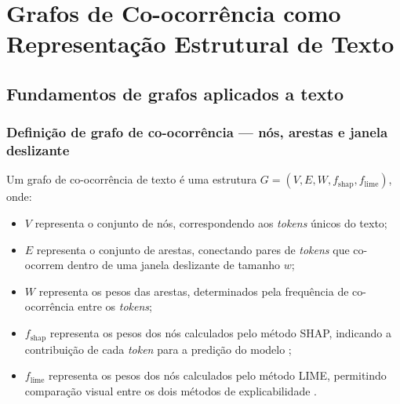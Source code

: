 \documentclass[
    12pt,                %
    openright,           %
    oneside,             %
    a4paper,             %
    english,             %
    brazil               %
]{abntex2}
\begin{document}
\section{Grafos de Co-ocorrência como Representação Estrutural de Texto}
\label{sec:grafos}

\subsection{Fundamentos de grafos aplicados a texto}
\label{subsec:grafos_fundamentos}

\subsubsection{Definição de grafo de co-ocorrência — nós, arestas e janela deslizante}
\label{subsubsec:grafos_definicao}

Um grafo de co-ocorrência de texto é uma estrutura 
$G = (V, E, W, f_{\text{shap}}, f_{\text{lime}})$, onde:

\begin{itemize}
    \item $V$ representa o conjunto de nós, correspondendo aos 
    \textit{tokens} únicos do texto;
    
    \item $E$ representa o conjunto de arestas, conectando pares 
    de \textit{tokens} que co-ocorrem dentro de uma janela 
    deslizante de tamanho $w$;
    
    \item $W$ representa os pesos das arestas, determinados pela 
    frequência de co-ocorrência entre os \textit{tokens};
    
    \item $f_{\text{shap}}$ representa os pesos dos nós calculados 
    pelo método SHAP, indicando a contribuição de cada 
    \textit{token} para a predição do modelo \cite{lundberg2017};
    
    \item $f_{\text{lime}}$ representa os pesos dos nós calculados 
    pelo método LIME, permitindo comparação visual entre os dois 
    métodos de explicabilidade \cite{ribeiro2016}.
\end{itemize}
\end{document}
